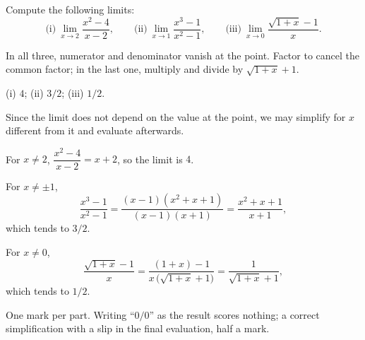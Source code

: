 
\begin{exercise}
Compute the following limits:
\[
  \text{(i)}\ \lim_{x \to 2} \frac{x^2 - 4}{x - 2} ,
  \qquad
  \text{(ii)}\ \lim_{x \to 1} \frac{x^3 - 1}{x^2 - 1} ,
  \qquad
  \text{(iii)}\ \lim_{x \to 0} \frac{\sqrt{1 + x} - 1}{x} .
\]


\begin{hint}
In all three, numerator and denominator vanish at the point. Factor to cancel
the common factor; in the last one, multiply and divide by
$\sqrt{1 + x} + 1$.
\end{hint}

\begin{answer}
(i) $4$; (ii) $3/2$; (iii) $1/2$.
\end{answer}

\begin{solution}
Since the limit does not depend on the value at the point, we may simplify
for $x$ different from it and evaluate afterwards.
\begin{parts}
  \item For $x \neq 2$, $\dfrac{x^2 - 4}{x - 2} = x + 2$, so the limit is
        $4$.
  \item For $x \neq \pm 1$,
        \[
          \frac{x^3 - 1}{x^2 - 1}
          = \frac{(x - 1)(x^2 + x + 1)}{(x - 1)(x + 1)}
          = \frac{x^2 + x + 1}{x + 1} ,
        \]
        which tends to $3/2$.
  \item For $x \neq 0$,
        \[
          \frac{\sqrt{1 + x} - 1}{x}
          = \frac{(1 + x) - 1}{x\,\bigl(\sqrt{1 + x} + 1\bigr)}
          = \frac{1}{\sqrt{1 + x} + 1} ,
        \]
        which tends to $1/2$.
\end{parts}
\end{solution}

\begin{marking}
One mark per part. Writing ``$0/0$'' as the result scores nothing; a correct
simplification with a slip in the final evaluation, half a mark.
\end{marking}
\end{exercise}
